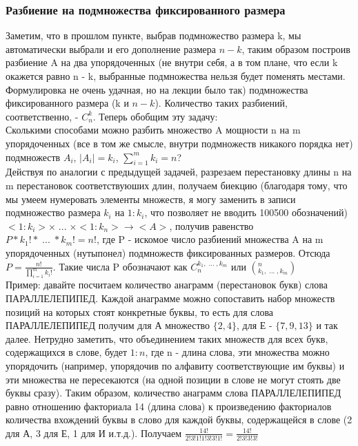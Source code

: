 \subsubsection{Разбиение на подмножества фиксированного размера}
Заметим, что в прошлом пункте, выбрав подмножество размера k, мы автоматически выбрали и его дополнение размера $n - k$, таким образом построив разбиение A на два упорядоченных (не внутри себя, а в том плане, что если k окажется равно n - k, выбранные подмножества нельзя будет поменять местами. Формулировка не очень удачная, но на лекции было так) подмножества фиксированного размера (k и $n - k$). Количество таких разбиений, соответственно, - $C_n^k$. Теперь обобщим эту задачу:\\
Сколькими способами можно разбить множество A мощности n на m упорядоченных (все в том же смысле, внутри подмножеств никакого порядка нет) подмножеств $A_i$, $|A_i| = k_i$, $\sum\limits_{i = 1}^{m}k_i = n$?\\
Действуя по аналогии с предыдущей задачей, разрезаем перестановку длины n на m перестановок соответствуюших длин, получаем биекцию (благодаря тому, что мы умеем нумеровать элементы множеств, я могу заменить в записи подмножество размера $k_i$ на $1:k_i$, что позволяет не вводить 100500 обозначений) $<1:k_i> \times \; ... \; \times <1:k_n> \rightarrow <A>$, получив равенство \\
$P * k_1! * \; ... \; * k_m! = n!$, где P - искомое число разбиений множества A на m упорядоченных (нутыпонел) подмножеств фиксированных размеров. Отсюда $P = \frac{n!}{\prod\limits_{i = 1}^{m} k_i!}$. Такие числа P обозначают как $C_n^{k_1, \; ... \; , k_m}$ или $(^n_{k_1, \; ... \; , k_m})$\\
Пример: давайте посчитаем количество анаграмм (перестановок букв) слова ПАРАЛЛЕЛЕПИПЕД. Каждой анаграмме можно сопоставить набор множеств позиций на которых стоят конкретные буквы, то есть для слова ПАРАЛЛЕЛЕПИПЕД получим для А множество $\{2, 4\}$, для Е - $\{7, 9, 13\}$ и так далее. Нетрудно заметить, что объединением таких множеств для всех букв, содержащихся в слове, будет $1:n$, где n - длина слова, эти множества можно упорядочить (например, упорядочив по алфавиту соответствующие им буквы) и эти множества не пересекаются (на одной позиции в слове не могут стоять две буквы сразу). Таким образом, количество анаграмм слова ПАРАЛЛЕЛЕПИПЕД равно отношению факториала 14 (длина слова) к произведению факториалов количества вхождений буквы в слово для каждой буквы, содержащейся в слове (2 для А, 3 для Е, 1 для И и.т.д.). Получаем $\frac{14!}{2!3!1!1!3!3!1!} = \frac{14!}{2!3!3!3!}$
